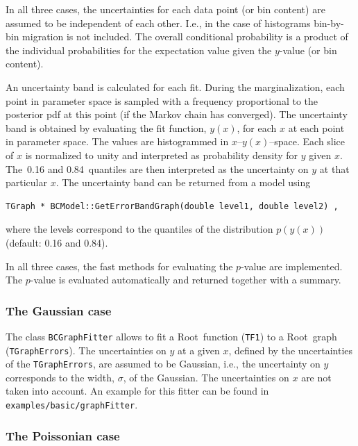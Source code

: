 \documentclass[11pt, a4paper]{article}
\newcommand{\Root}{{\sc Root}}
\begin{document}
In all three cases, the uncertainties for each data point (or bin
content) are assumed to be independent of each other. I.e., in the
case of histograms bin-by-bin migration is not included. The overall
conditional probability is a product of the individual probabilities
for the expectation value given the $y$-value (or bin content).

An uncertainty band is calculated for each fit. During the
marginalization, each point in parameter space is sampled with a
frequency proportional to the posterior pdf at this point (if the
Markov chain has converged). The uncertainty band is obtained by
evaluating the fit function, $y(x)$, for each $x$ at each point in
parameter space. The values are histogrammed in
$x$--$y(x)$--space. Each slice of $x$ is normalized to unity and
interpreted as probability density for $y$ given $x$. The~0.16 and
0.84~quantiles are then interpreted as the uncertainty on $y$ at that
particular $x$. The uncertainty band can be returned from a model
using
%
\begin{verbatim}
TGraph * BCModel::GetErrorBandGraph(double level1, double level2) ,
\end{verbatim}
%
where the levels correspond to the quantiles of the distribution
$p(y(x))$ (default: 0.16 and 0.84).

In all three cases, the fast methods for evaluating the $p$-value are
implemented. The $p$-value is evaluated automatically and returned
together with a summary.

\subsubsection{The Gaussian case}
\label{BCGraphFitter}

The class \verb|BCGraphFitter| allows to fit a \Root\ function
(\verb|TF1|) to a \Root\ graph (\verb|TGraphErrors|). The
uncertainties on $y$ at a given $x$, defined by the uncertainties of
the \verb|TGraphErrors|, are assumed to be Gaussian, i.e., the
uncertainty on $y$ corresponds to the width, $\sigma$, of the
Gaussian. The uncertainties on $x$ are not taken into account.  An
example for this fitter can be found in
\verb|examples/basic/graphFitter|.


\subsubsection{The Poissonian case}
\end{document}
